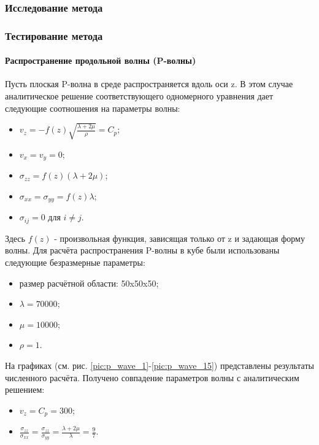 \clearpage
\newpage

\subsubsection{Исследование метода}


\clearpage
\newpage

\subsubsection{Тестирование метода}

\paragraph{Распространение продольной волны (P-волны)}
Пусть плоская P-волна в среде распространяется вдоль оси z. В этом случае аналитическое решение соответствующего одномерного уравнения дает следующие соотношения на параметры волны:
\begin{itemize}
\item $v_z=-f(z)\sqrt{\frac{\lambda+2\mu}{\rho}}=C_p$;
\item $v_x=v_y=0$;
\item $\sigma_{zz}=f(z)(\lambda+2\mu)$;
\item $\sigma_{xx}=\sigma_{yy}=f(z)\lambda$;
\item $\sigma_{ij}=0$ для $i \neq j$.
\end{itemize}
Здесь $f(z)$ - произвольная функция, зависящая только от z и задающая форму волны.
Для расчёта распространения P-волны в кубе были использованы следующие безразмерные параметры: 
\begin{itemize}
\item размер расчётной области: 50x50x50;
\item $\lambda=70000$;
\item $\mu=10000$;
\item $\rho=1$.
\end{itemize}
На графиках (см. рис.
\ref{pic:p_wave_1}-\ref{pic:p_wave_15}) представлены результаты численного расчёта. Получено совпадение параметров волны с аналитическим решением:
\begin{itemize}
\item $v_z=C_p=300$;
\item $\frac{\sigma_{zz}}{\sigma_{xx}}=\frac{\sigma_{zz}}{\sigma_{yy}}=\frac{\lambda+2\mu}{\lambda}=\frac{9}{7}$.
\end{itemize}

